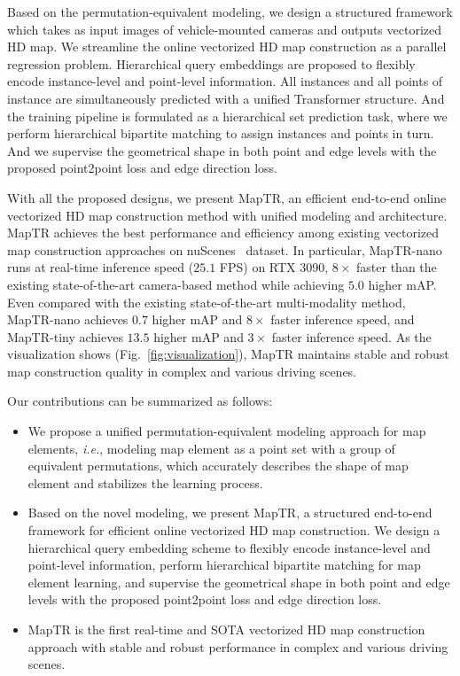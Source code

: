 \documentclass{article} \usepackage{iclr2023_conference,times}
\def\ie{\emph{i.e.}} \def\Ie{\emph{I.e.}}
\begin{document}
Based on the permutation-equivalent modeling, we design a structured framework which takes as input images of vehicle-mounted cameras and outputs vectorized HD map.
We streamline the online vectorized HD map construction as a parallel regression problem.  
Hierarchical query embeddings are proposed to flexibly encode instance-level and point-level information. All instances and all points of instance are simultaneously predicted with a unified Transformer structure. And   the training pipeline is formulated as a hierarchical set prediction task, where we perform hierarchical bipartite matching to assign instances and points in turn. And we supervise the geometrical shape in both point and edge levels with the proposed point2point loss and edge direction loss.

With all the proposed designs, we present MapTR, an efficient end-to-end online vectorized HD map construction method with unified modeling and  architecture.
MapTR achieves the best performance and efficiency among existing vectorized map construction approaches on nuScenes~\citep{nuscenes} dataset. In particular, MapTR-nano runs at real-time inference speed ($25.1$ FPS) on RTX 3090, $8\times$ faster than the existing state-of-the-art camera-based method while achieving $5.0$ higher mAP.
Even compared with the existing state-of-the-art multi-modality method, MapTR-nano achieves $0.7$ higher mAP and $8\times$ faster inference speed, and MapTR-tiny achieves $13.5$ higher mAP and $3\times$ faster inference speed.
As the visualization shows (Fig.~\ref{fig:visualization}), MapTR maintains stable and robust map construction quality in complex and various driving scenes.

Our contributions can be summarized as follows:
\begin{itemize}
    \item We propose a unified permutation-equivalent modeling approach for map elements, \ie, modeling map element as a point set with a group of equivalent permutations, which accurately describes the shape of map element and stabilizes the learning process.
\item  Based on the novel modeling, we present MapTR, a structured end-to-end framework for efficient online vectorized HD map construction.
    We design a hierarchical query embedding scheme to flexibly encode instance-level and point-level information, perform hierarchical bipartite matching for map element learning,  and supervise the geometrical shape in both point and edge levels with the proposed point2point loss and edge direction loss.
    \item  MapTR is the first real-time and SOTA vectorized HD map construction approach with stable and robust performance in complex and various driving scenes.
\end{itemize}
\end{document}
